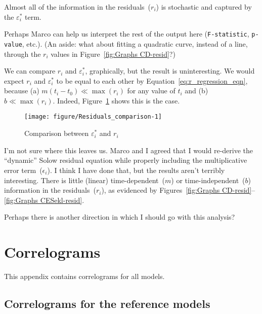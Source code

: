 \documentclass[preprint,authoryear,12pt]{elsarticle}\usepackage[]{graphicx}\usepackage[]{color}
\makeatletter
\def\maxwidth{ %
  \ifdim\Gin@nat@width>\linewidth
    \linewidth
  \else
    \Gin@nat@width
  \fi
}
\newenvironment{knitrout}{}{} %
\makeatother
\begin{document}
Almost all of the information in the residuals~($r_i$)
is stochastic and captured by the $\varepsilon_i^*$ term.

Perhaps Marco can help us interpret the rest of the
output here (\texttt{F-statistic}, \texttt{p-value}, etc.).
(An aside: what about fitting a quadratic curve,
instead of a line, 
through the $r_i$ values in Figure~\ref{fig:Graphs CD-resid}?)

We can compare $r_i$ and $\varepsilon_i^*$, graphically,
but the result is uninteresting. 
We would expect $r_i$ and $\varepsilon_i^*$
to be equal to each other by Equation~\ref{eq:r_regression_eqn}, 
because
(a) $m (t_i - t_0) \ll \max(r_i)$
for any value of $t_i$
and
(b) $b \ll \max(r_i)$.
Indeed, Figure~\ref{fig:Residuals_comparison}
shows this is the case.
%
\begin{knitrout}
\color{fgcolor}\begin{figure}[H]

{\centering \texttt{[image: figure/Residuals\_comparison-1]} 

}

\caption[Comparison between ]{Comparison between $\varepsilon_i^*$ and $r_i$}\label{fig:Residuals_comparison}
\end{figure}


\end{knitrout}
%
I'm not sure where this leaves us.
Marco and I agreed that I would re-derive the ``dynamic'' Solow residual
equation while properly including the multiplicative error term~($\epsilon_i$).
I think I have done that, but the results aren't terribly interesting.
There is little (linear) time-dependent~($m$) or 
time-independent~($b$) 
information in the residuals~($r_i$),
as evidenced by Figures~\ref{fig:Graphs CD-resid}--\ref{fig:Graphs CESekl-resid}.

Perhaps there is another direction in which I should go with this analysis?


\section{Correlograms} 
\label{sec:correlograms}

This appendix contains correlograms for all models.

\subsection{Correlograms for the reference models} 
\label{sec:correlograms_ref}
\end{document}
